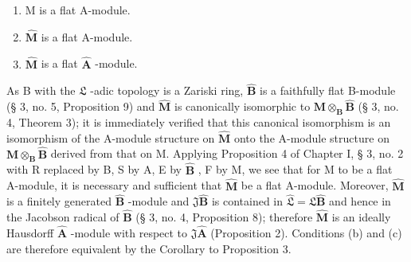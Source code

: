 \begin{enumerate}
\def\labelenumi{(\alph{enumi})}
\item
  M is a flat A-module.
\item
  \(\hat{\mathbf{M}}\) is a flat A-module.
\item
  \(\hat{\mathbf{M}}\) is a flat \(\hat{\mathbf{A}}\) -module.
\end{enumerate}

As B with the \(\mathfrak{L}\) -adic topology is a Zariski ring, \(\hat{\mathbf{B}}\) is a faithfully flat B-module (§ 3, no. 5, Proposition 9) and \(\hat{\mathbf{M}}\) is canonically isomorphic to \(\mathbf{M} \otimes_{\mathbf{B}} \hat{\mathbf{B}}\) (§ 3, no. 4, Theorem 3); it is immediately verified that this canonical isomorphism is an isomorphism of the A-module structure on \(\hat{\mathbf{M}}\) onto the A-module structure on \(\mathbf{M} \otimes_{\mathbf{B}} \hat{\mathbf{B}}\) derived from that on M. Applying Proposition 4 of Chapter I, § 3, no. 2 with R replaced by B, S by A, E by \(\hat{\mathbf{B}}\) , F by M, we see that for M to be a flat A-module, it is necessary and sufficient that \(\hat{\mathbf{M}}\) be a flat A-module. Moreover, \(\hat{\mathbf{M}}\) is a finitely generated \(\hat{\mathbf{B}}\) -module and \(\mathfrak{J}\hat{\mathbf{B}}\) is contained in \(\hat{\mathfrak{L}} = \mathfrak{L}\hat{\mathbf{B}}\) and hence in the Jacobson radical of \(\hat{\mathbf{B}}\) (§ 3, no. 4, Proposition 8); therefore \(\hat{\mathbf{M}}\) is an ideally Hausdorff \(\hat{\mathbf{A}}\) -module with respect to \(\mathfrak{J}\hat{\mathbf{A}}\) (Proposition 2). Conditions (b) and (c) are therefore equivalent by the Corollary to Proposition 3.


